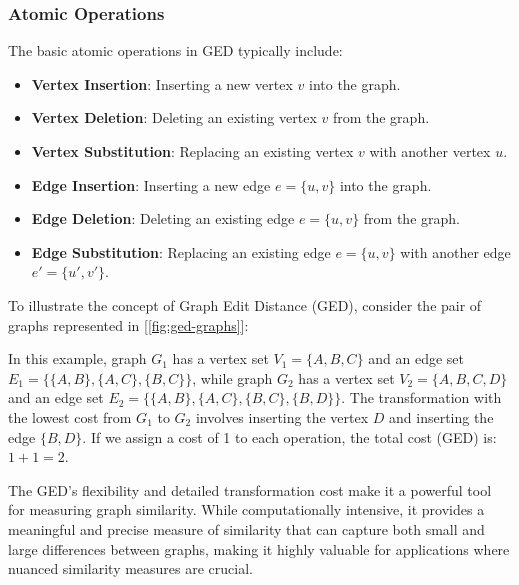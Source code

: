 \documentclass[../Thesis.tex]{subfiles}
\begin{document}
	\subsubsection{Atomic Operations}
	The basic atomic operations in GED typically include:
	
	\begin{itemize}
		\item \textbf{Vertex Insertion}: Inserting a new vertex $v$ into the graph.
		\item \textbf{Vertex Deletion}: Deleting an existing vertex $v$ from the graph.
		\item \textbf{Vertex Substitution}: Replacing an existing vertex $v$ with another vertex $u$.
		\item \textbf{Edge Insertion}: Inserting a new edge $e = \{u, v\}$ into the graph.
		\item \textbf{Edge Deletion}: Deleting an existing edge $e = \{u, v\}$ from the graph.
		\item \textbf{Edge Substitution}: Replacing an existing edge $e = \{u, v\}$ with another edge $e' = \{u', v'\}$.
	\end{itemize}
	
	To illustrate the concept of Graph Edit Distance (GED), consider the pair of graphs represented in [\autoref{fig:ged-graphs}]:
	
	In this example, graph $G_1$ has a vertex set $V_1 = \{A, B, C\}$ and an edge set $E_1 = \{\{A, B\}, \{A, C\}, \{B, C\}\}$, while graph $G_2$ has a vertex set $V_2 = \{A, B, C, D\}$ and an edge set $E_2 = \{\{A, B\}, \{A, C\}, \{B, C\}, \{B, D\}\}$. The transformation with the lowest cost from $G_1$ to $G_2$ involves inserting the vertex $D$ and inserting the edge $\{B, D\}$. If we assign a cost of 1 to each operation, the total cost (GED) is: $1+1=2$.
	
	The GED's flexibility and detailed transformation cost make it a powerful tool for measuring graph similarity. While computationally intensive, it provides a meaningful and precise measure of similarity that can capture both small and large differences between graphs, making it highly valuable for applications where nuanced similarity measures are crucial.
	
\end{document}
